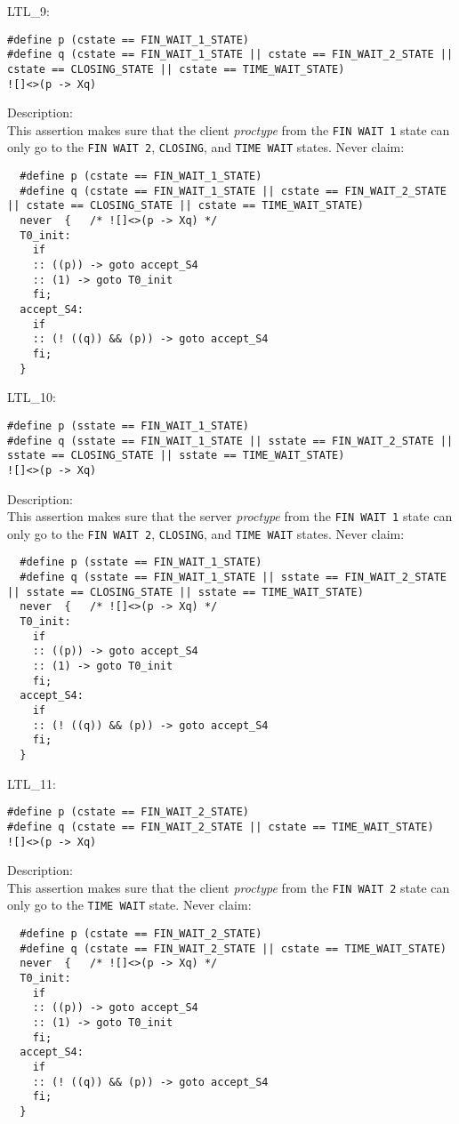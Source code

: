 \documentclass{WigReport}
\begin{document}
LTL\_9:\\
\begin{lstlisting}
#define p (cstate == FIN_WAIT_1_STATE)
#define q (cstate == FIN_WAIT_1_STATE || cstate == FIN_WAIT_2_STATE || cstate == CLOSING_STATE || cstate == TIME_WAIT_STATE)
![]<>(p -> Xq)
\end{lstlisting}
Description:\\
This assertion makes sure that the client \textit{proctype} from the \verb|FIN WAIT 1| state can only go to the \verb|FIN WAIT 2|, \verb|CLOSING|, and \verb|TIME WAIT| states.
Never claim:\\
\begin{lstlisting}
  #define p (cstate == FIN_WAIT_1_STATE)
  #define q (cstate == FIN_WAIT_1_STATE || cstate == FIN_WAIT_2_STATE || cstate == CLOSING_STATE || cstate == TIME_WAIT_STATE)
  never  {   /* ![]<>(p -> Xq) */
  T0_init:
    if
    :: ((p)) -> goto accept_S4
    :: (1) -> goto T0_init
    fi;
  accept_S4:
    if
    :: (! ((q)) && (p)) -> goto accept_S4
    fi;
  }
\end{lstlisting}


LTL\_10:\\
\begin{lstlisting}
#define p (sstate == FIN_WAIT_1_STATE)
#define q (sstate == FIN_WAIT_1_STATE || sstate == FIN_WAIT_2_STATE || sstate == CLOSING_STATE || sstate == TIME_WAIT_STATE)
![]<>(p -> Xq)
\end{lstlisting}
Description:\\
This assertion makes sure that the server \textit{proctype} from the \verb|FIN WAIT 1| state can only go to the \verb|FIN WAIT 2|, \verb|CLOSING|, and \verb|TIME WAIT| states.
Never claim:\\
\begin{lstlisting}
  #define p (sstate == FIN_WAIT_1_STATE)
  #define q (sstate == FIN_WAIT_1_STATE || sstate == FIN_WAIT_2_STATE || sstate == CLOSING_STATE || sstate == TIME_WAIT_STATE)
  never  {   /* ![]<>(p -> Xq) */
  T0_init:
    if
    :: ((p)) -> goto accept_S4
    :: (1) -> goto T0_init
    fi;
  accept_S4:
    if
    :: (! ((q)) && (p)) -> goto accept_S4
    fi;
  }
\end{lstlisting}


LTL\_11:\\
\begin{lstlisting}
#define p (cstate == FIN_WAIT_2_STATE)
#define q (cstate == FIN_WAIT_2_STATE || cstate == TIME_WAIT_STATE)
![]<>(p -> Xq)
\end{lstlisting}
Description:\\
This assertion makes sure that the client \textit{proctype} from the \verb|FIN WAIT 2| state can only go to the \verb|TIME WAIT| state.
Never claim:\\
\begin{lstlisting}
  #define p (cstate == FIN_WAIT_2_STATE)
  #define q (cstate == FIN_WAIT_2_STATE || cstate == TIME_WAIT_STATE)
  never  {   /* ![]<>(p -> Xq) */
  T0_init:
    if
    :: ((p)) -> goto accept_S4
    :: (1) -> goto T0_init
    fi;
  accept_S4:
    if
    :: (! ((q)) && (p)) -> goto accept_S4
    fi;
  }
\end{lstlisting}
\end{document}
